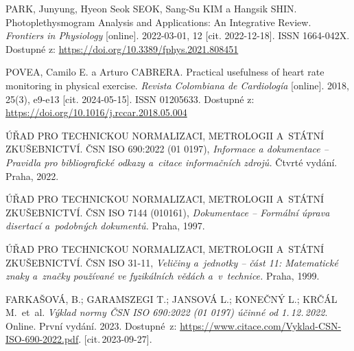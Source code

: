\begin{thebibliography}{99}
		PARK, Junyung, Hyeon Seok SEOK, Sang-Su KIM a Hangsik SHIN.
		Photoplethysmogram Analysis and Applications: An Integrative Review.
		\emph{Frontiers in Physiology} [online].
		2022-03-01, 12 [cit. 2022-12-18].
		ISSN 1664-042X.
		Dostupné z: \url{https://doi.org/10.3389/fphys.2021.808451}

		POVEA, Camilo E. a Arturo CABRERA.
		Practical usefulness of heart rate monitoring in physical exercise.
		\emph{Revista Colombiana de Cardiología} [online].
		2018, 25(3), e9-e13 [cit. 2024-05-15].
		ISSN 01205633.
		Dostupné z: \url{https://doi.org/10.1016/j.rccar.2018.05.004}


		ÚŘAD PRO TECHNICKOU NORMALIZACI, METROLOGII A~STÁTNÍ ZKUŠEBNICTVÍ.
		ČSN ISO 690:2022 (01 0197), \emph{Informace a dokumentace -- Pravidla pro bibliografické odkazy a~citace informačních zdrojů.}
		Čtvrté vydání. Praha, 2022.

		ÚŘAD PRO TECHNICKOU NORMALIZACI, METROLOGII A~STÁTNÍ ZKUŠEBNICTVÍ.
		ČSN ISO 7144 (010161), \emph{Dokumentace -- Formální úprava disertací a~podobných dokumentů.}
		Praha, 1997.

		ÚŘAD PRO TECHNICKOU NORMALIZACI, METROLOGII A~STÁTNÍ ZKUŠEBNICTVÍ.
		ČSN ISO 31-11, \emph{Veličiny a~jednotky -- část 11: Matematické znaky a~značky používané ve fyzikálních vědách a~v~technice.}
		Praha, 1999.

		FARKAŠOVÁ, B.; GARAMSZEGI T.; JANSOVÁ L.; KONEČNÝ L.; KRČÁL M.\ et~al.
		\emph{Výklad normy ČSN ISO 690:2022 (01 0197) účinné od 1.\,12.\,2022}.
		Online. První vydání. 2023.
		Dostupné~z:
		\url{https://www.citace.com/Vyklad-CSN-ISO-690-2022.pdf}.
		[cit.\,2023-09-27].

\end{thebibliography}


%
%
%

